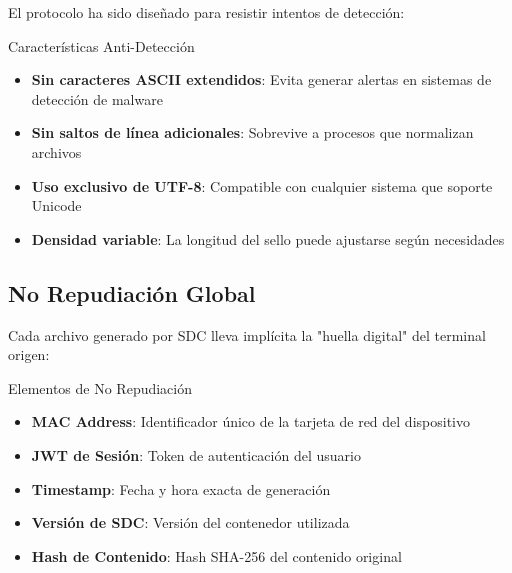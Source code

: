 El protocolo ha sido diseñado para resistir intentos de detección:

\begin{caja}{Características Anti-Detección}
\begin{itemize}
\item \textbf{Sin caracteres ASCII extendidos}: Evita generar alertas en sistemas de detección de malware
\item \textbf{Sin saltos de línea adicionales}: Sobrevive a procesos que normalizan archivos
\item \textbf{Uso exclusivo de UTF-8}: Compatible con cualquier sistema que soporte Unicode
\item \textbf{Densidad variable}: La longitud del sello puede ajustarse según necesidades
\end{itemize}
\end{caja}


\subsection{No Repudiación Global}

Cada archivo generado por SDC lleva implícita la "huella digital" del terminal origen:

\begin{caja}{Elementos de No Repudiación}
\begin{itemize}
\item \textbf{MAC Address}: Identificador único de la tarjeta de red del dispositivo
\item \textbf{JWT de Sesión}: Token de autenticación del usuario
\item \textbf{Timestamp}: Fecha y hora exacta de generación
\item \textbf{Versión de SDC}: Versión del contenedor utilizada
\item \textbf{Hash de Contenido}: Hash SHA-256 del contenido original
\end{itemize}
\end{caja}


